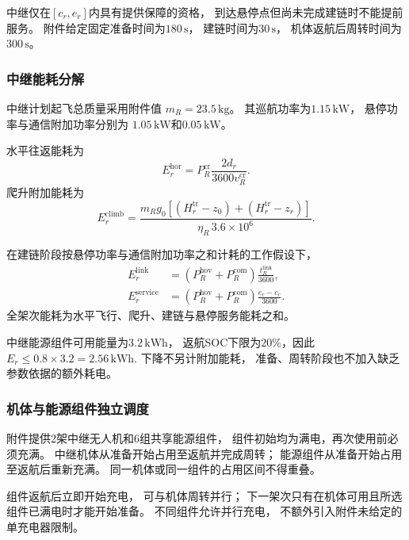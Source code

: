 \documentclass[bwprint]{gmcmthesis}
\begin{document}
中继仅在$[c_r,e_r]$内具有提供保障的资格，
到达悬停点但尚未完成建链时不能提前服务。
附件给定固定准备时间为$180\,\mathrm{s}$，
建链时间为$30\,\mathrm{s}$，
机体返航后周转时间为$300\,\mathrm{s}$。

\subsubsection{中继能耗分解}

中继计划起飞总质量采用附件值
$m_R=23.5\,\mathrm{kg}$。
其巡航功率为$1.15\,\mathrm{kW}$，
悬停功率与通信附加功率分别为
$1.05\,\mathrm{kW}$和$0.05\,\mathrm{kW}$。

水平往返能耗为
\begin{equation}
    E_r^{\mathrm{hor}}
    =
    P_R^{\mathrm{cr}}
    \frac{2d_r}{3600v_R^{\mathrm{cr}}}.
\end{equation}
爬升附加能耗为
\begin{equation}
    E_r^{\mathrm{climb}}
    =
    \frac{
    m_Rg_0
    \left[
    (H_r^{\mathrm{tr}}-z_0)
    +(H_r^{\mathrm{tr}}-z_r)
    \right]
    }{\eta_R\,3.6\times10^6}.
\end{equation}

在建链阶段按悬停功率与通信附加功率之和计耗的工作假设下，
\begin{align}
    E_r^{\mathrm{link}}
    &=
    (P_R^{\mathrm{hov}}+P_R^{\mathrm{com}})
    \frac{t_R^{\mathrm{link}}}{3600},\\
    E_r^{\mathrm{service}}
    &=
    (P_R^{\mathrm{hov}}+P_R^{\mathrm{com}})
    \frac{e_r-c_r}{3600}.
\end{align}
全架次能耗为水平飞行、爬升、建链与悬停服务能耗之和。

中继能源组件可用能量为$3.2\,\mathrm{kWh}$，
返航SOC下限为$20\%$，因此
\(E_r\leq0.8\times3.2=2.56\,\mathrm{kWh}\).
下降不另计附加能耗，
准备、周转阶段也不加入缺乏参数依据的额外耗电。

\subsubsection{机体与能源组件独立调度}

附件提供2架中继无人机和6组共享能源组件，
组件初始均为满电，再次使用前必须充满。
中继机体从准备开始占用至返航并完成周转；
能源组件从准备开始占用至返航后重新充满。
同一机体或同一组件的占用区间不得重叠。

组件返航后立即开始充电，
可与机体周转并行；
下一架次只有在机体可用且所选组件已满电时才能开始准备。
不同组件允许并行充电，
不额外引入附件未给定的单充电器限制。
\end{document}
